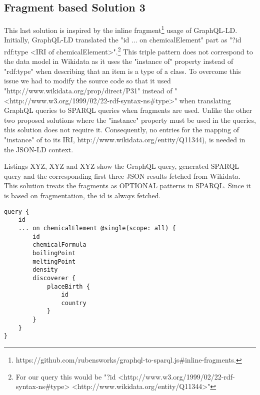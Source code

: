 \subsection{Fragment based Solution 3}

This last solution is inspired by the inline fragment\footnote{https://github.com/rubensworks/graphql-to-sparql.js\#inline-fragments.} usage of GraphQL-LD. Initially, GraphQL-LD translated the "id ... on chemicalElement" part as "?id rdf:type <IRI of chemicalElement>".\footnote{For our query this would be "?id <http://www.w3.org/1999/02/22-rdf-syntax-ns\#type> <http://www.wikidata.org/entity/Q11344>"} This triple pattern does not correspond to the data model in Wikidata as it uses the "instance of" property instead of "rdf:type" when describing that an item is a type of a class. To overcome this issue we had to modify the source code so that it used "http://www.wikidata.org/prop/direct/P31" instead of "<http://www.w3.org/1999/02/22-rdf-syntax-ns\#type>" when translating GraphQL queries to SPARQL queries when fragments are used. Unlike the other two proposed solutions where the "instance" property must be used in the queries, this solution does not require it. Consequently, no entries for the mapping of "instance" of to its IRI, http://www.wikidata.org/entity/Q11344), is needed in the JSON-LD context.

Listings XYZ, XYZ and XYZ show the GraphQL query, generated SPARQL query and the corresponding first three JSON results fetched from Wikidata. This solution treats the fragments as OPTIONAL patterns in SPARQL. Since it is based on fragmentation, the id is always fetched.

\begin{minipage}{\linewidth}
\begin{lstlisting}[label=listing:listing26, caption={Query}]
query {
    id
    ... on chemicalElement @single(scope: all) {
        id
        chemicalFormula
        boilingPoint
        meltingPoint
        density
        discoverer {
            placeBirth {
                id
                country
            }
        }
    }
}
\end{lstlisting}
\end{minipage}


